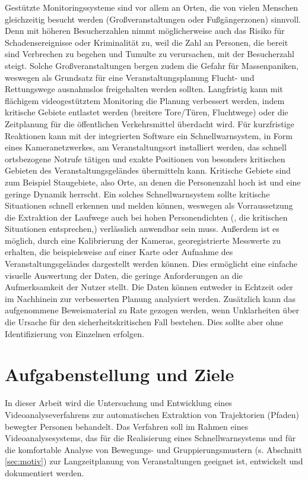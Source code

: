 Gestützte Monitoringssysteme sind vor allem an Orten, die von vielen Menschen gleichzeitig besucht werden (\zb Großveranstaltungen oder Fußgängerzonen) sinnvoll. Denn mit höheren Besucherzahlen nimmt möglicherweise auch das Risiko für Schadensereignisse oder Kriminalität zu, weil die Zahl an Personen, die bereit sind Verbrechen zu begehen und Tumulte zu verursachen, mit der Besucherzahl steigt. Solche Großveranstaltungen bergen zudem die Gefahr für Massenpaniken, weswegen als Grundsatz für eine Veranstaltungsplanung Flucht- und Rettungswege ausnahmslos freigehalten werden sollten. Langfristig kann mit flächigem videogestütztem Monitoring die Planung verbessert werden, indem \zb kritische Gebiete entlastet werden (breitere Tore/Türen, Fluchtwege) oder die Zeitplanung für die öffentlichen Verkehrsmittel überdacht wird. Für kurzfristige Reaktionen kann mit der integrierten Software ein Schnellwarnsystem, in Form eines Kameranetzwerkes, am Veranstaltungsort installiert werden, das schnell ortsbezogene Notrufe tätigen und exakte Positionen von besonders kritischen Gebieten des Veranstaltungsgeländes übermitteln kann. Kritische Gebiete sind zum Beispiel Staugebiete, also Orte, an denen die Personenzahl hoch ist und eine geringe Dynamik herrscht. Ein solches Schnellwarnsystem sollte kritische Situationen schnell erkennen und melden können, weswegen als Vorraussetzung die Extraktion der Laufwege auch bei hohen Personendichten (, die kritischen Situationen entsprechen,) verlässlich anwendbar sein muss.
Außerdem ist es möglich, durch eine Kalibrierung der Kameras, georegistrierte Messwerte zu erhalten, die beispielsweise auf einer Karte oder Aufnahme des Veranstaltungsgeländes dargestellt werden können. Dies ermöglicht eine einfache visuelle Auswertung der Daten, die geringe Anforderungen an die Aufmerksamkeit der Nutzer stellt. Die Daten können entweder in Echtzeit oder im Nachhinein zur verbesserten Planung analysiert werden. Zusätzlich kann das aufgenommene Beweismaterial zu Rate gezogen werden, wenn Unklarheiten über die Ursache für den sicherheitskritischen Fall bestehen. Dies sollte aber ohne Identifizierung von Einzelnen erfolgen.

\section{Aufgabenstellung und Ziele}
\label{sec:ziele}
In dieser Arbeit wird die Untersuchung und Entwicklung eines Videoanalyseverfahrens zur automatischen Extraktion von Trajektorien (Pfaden) bewegter Personen behandelt. Das Verfahren soll im Rahmen eines Videoanalysesystems, das für die Realisierung eines Schnellwarnsystems und für die komfortable Analyse von Bewegungs- und Gruppierungsmustern (s. Abschnitt \ref{sec:motiv}) zur Langzeitplanung von Veranstaltungen geeignet ist, entwickelt und dokumentiert werden. 
\newpage

